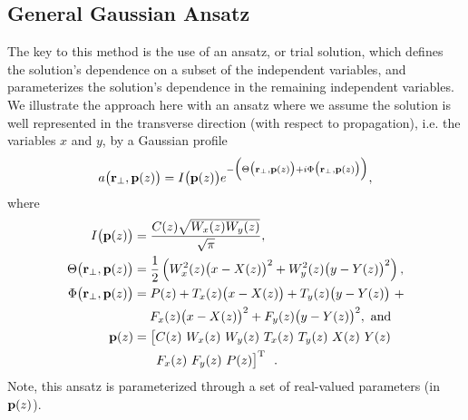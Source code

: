 \documentclass[9pt,twocolumn,twoside]{osajnl}
\newcommand{\la}[1]{\label{#1}}
\begin{document}
\vspace*{-3mm}
\subsection{General Gaussian Ansatz}
The key to this method is the use of an ansatz, or trial solution, 
which defines the solution's dependence on a subset of the independent 
variables, and parameterizes the solution's dependence in the remaining 
independent variables. We illustrate the approach here with an ansatz where we assume the solution is well represented in the 
transverse direction (with respect to propagation), 
i.e. the variables $x$ and $y$, by a Gaussian profile
\begin{equation}\la{equ:GaussianAnsatz}
 a\big( {\bf r}_{\perp}, {\bf p}(z) \big) = I\big( {\bf p}(z) \big) e^{-\Big( \Theta\big( {\bf r}_{\perp},{\bf p}(z) \big) + i \Phi\big( {\bf r}_{\perp}, {\bf p}(z) \big) \Big)},
\end{equation}
where
\begin{align*}
 I\big( {\bf p}(z) \big) & = \frac{C(z) \sqrt{W_{x}(z) W_{y}(z)}}{\sqrt{\pi}}, \\
 \Theta\big( {\bf r}_{\perp}, {\bf p}(z) \big) & = \frac{1}{2} \left( W_{x}^{2}(z) \big( x - X(z) \big)^{2} + W_{y}^{2}(z) \big( y - Y(z) \big)^{2} \right), \\
 \Phi\big( {\bf r}_{\perp}, {\bf p}(z) \big) & = P(z) + T_{x}(z) \big( x - X(z) \big) + T_{y}(z) \big( y - Y(z) \big) \ + \\
 & \hspace{13pt} F_{x}(z) \big( x - X(z) \big)^{2} + F_{y}(z) \big( y - Y(z) \big)^{2}, \text{ and} \\
 {\bf p}(z) & = \big[ C(z) \ W_{x}(z) \ W_{y}(z) \ T_{x}(z) \ T_{y}(z) \ X(z) \ Y(z) \\
 & \hspace{18pt} F_{x}(z) \ F_{y}(z) \ P(z) \big]^{\text{T}} \ \ .
\end{align*}
Note, this ansatz is parameterized through a set of real-valued parameters 
(in ${\bf p}(z)$). 
\end{document}
